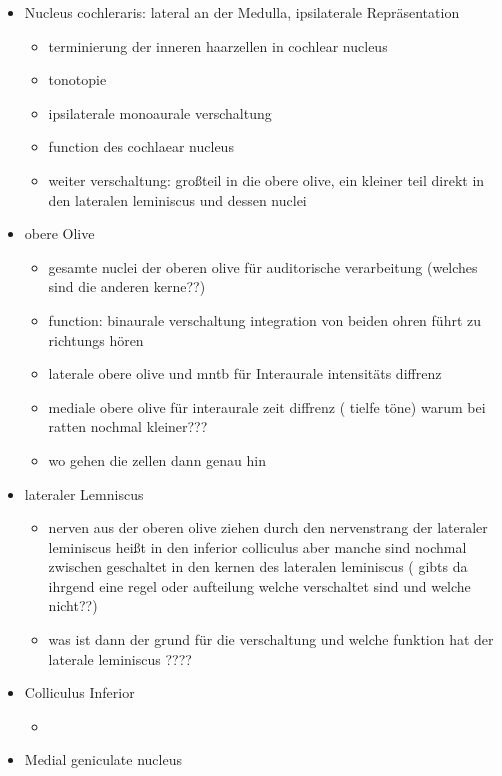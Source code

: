 \documentclass[12pt,a4paper,pdftex]{article}
\begin{document}
\begin{itemize}
\begin{itemize}
    \end{itemize}
    \item Nucleus cochleraris: lateral an der Medulla, ipsilaterale Repräsentation
    \begin{itemize}
        \item terminierung der inneren haarzellen in cochlear nucleus 
        \item tonotopie 
        \item ipsilaterale monoaurale verschaltung
        \item function des cochlaear nucleus
        \item weiter verschaltung: großteil in die obere olive, ein kleiner teil direkt in den lateralen leminiscus und dessen nuclei 
    \end{itemize}
    \item obere Olive
    \begin{itemize}
        \item gesamte nuclei der oberen olive für auditorische verarbeitung (welches sind die anderen kerne??)
        \item function: binaurale verschaltung integration von beiden ohren führt zu richtungs hören
        \item laterale obere olive und mntb für Interaurale intensitäts diffrenz
        \item mediale obere olive für interaurale zeit diffrenz ( tielfe töne) warum bei ratten nochmal kleiner???
        \item wo gehen die zellen dann genau hin
    \end{itemize}
    \item lateraler Lemniscus
    \begin{itemize}
        \item nerven aus der oberen olive ziehen durch den nervenstrang der lateraler leminiscus heißt in den inferior colliculus aber manche sind nochmal zwischen geschaltet in den kernen des lateralen leminiscus ( gibts da ihrgend eine regel oder aufteilung welche verschaltet sind und welche nicht??)
        \item was ist dann der grund für die verschaltung und welche funktion hat der laterale leminiscus ????
    \end{itemize}
    \item Colliculus Inferior
    \begin{itemize}
        \item 
    \end{itemize}
    \item Medial geniculate nucleus
\end{itemize}
\end{document}
